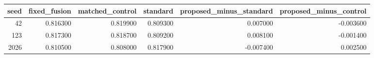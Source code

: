 \begin{tabular}{rrrrrr}
\toprule
seed & fixed\_fusion & matched\_control & standard & proposed\_minus\_standard & proposed\_minus\_control \\
\midrule
42 & 0.816300 & 0.819900 & 0.809300 & 0.007000 & -0.003600 \\
123 & 0.817300 & 0.818700 & 0.809200 & 0.008100 & -0.001400 \\
2026 & 0.810500 & 0.808000 & 0.817900 & -0.007400 & 0.002500 \\
\bottomrule
\end{tabular}
